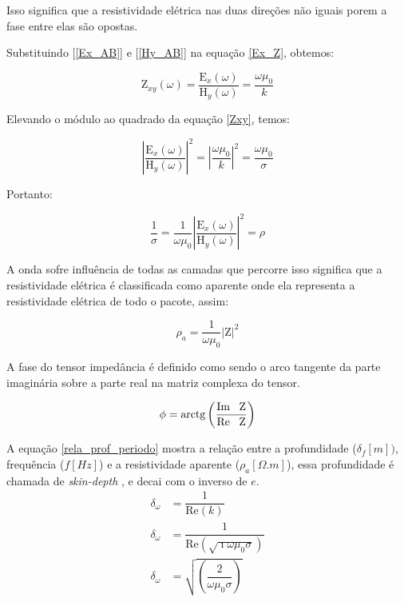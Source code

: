         Isso significa que a resistividade elétrica nas duas direções não iguais porem a fase entre elas são opostas.
        
        Substituindo [\ref{Ex_AB}] e [\ref{Hy_AB}] na equação \ref{Ex_Z}, obtemos:
        
        \begin{equation}
        \label{Zxy}
         \textrm{Z}_{xy}(\omega) = \dfrac{\textrm{E}_x(\omega)}{\textrm{H}_y(\omega)} = \dfrac{\omega \mu_0}{k}
        \end{equation}
        
        Elevando o módulo ao quadrado da equação \ref{Zxy}, temos:
        
        \begin{equation}
         \left | \dfrac{\textrm{E}_x(\omega)}{\textrm{H}_y(\omega)} \right | ^2 = \left | \dfrac{\omega \mu_0}{k} \right | ^2 = \dfrac{\omega \mu_0}{\sigma}
        \end{equation}
        
        Portanto:
        
        \begin{equation}
         \dfrac{1}{\sigma} = \dfrac{1}{\omega \mu_0} \left | \dfrac{\textrm{E}_x(\omega)}{\textrm{H}_y(\omega)} \right | ^2 = \rho
        \end{equation}
        
        A onda sofre influência de todas as camadas que percorre isso significa que a resistividade elétrica é classificada como aparente onde ela representa a resistividade elétrica de todo o pacote, assim:
        
        \begin{equation}
         \rho_a = \dfrac{1}{\omega \mu_0} \left | \textrm{Z} \right | ^2
        \end{equation}
        
        A fase do tensor impedância é definido como sendo o arco tangente da parte imaginária sobre a parte real na matriz complexa do tensor.
        
        \begin{equation}
         \phi = \textrm{arctg} \left ( \dfrac{\textrm{Im \, Z}}{\textrm{Re \, Z}} \right )
        \end{equation}
        
        A equação \ref{rela_prof_periodo} mostra a relação entre a profundidade
	($\delta_f[m])$, frequência ($f[Hz]$) e a resistividade aparente ($\rho_a[\Omega.m]$), essa 
	profundidade é chamada de \textit{skin-depth} \cite{eletromag8hayt}, e decai com o inverso de $e$.
	\begin{align*}
	 \delta_\omega & = \dfrac{1}{\textrm{Re}(k)} \\
	  \delta_\omega & = \dfrac{1}{\textrm{Re} \left (\sqrt{\imath \omega \mu_0 \sigma} \right)}  \\
	  \delta_\omega & = \sqrt{ \left (\dfrac{2}{\omega \mu_0 \sigma} \right )}
	\end{align*}

